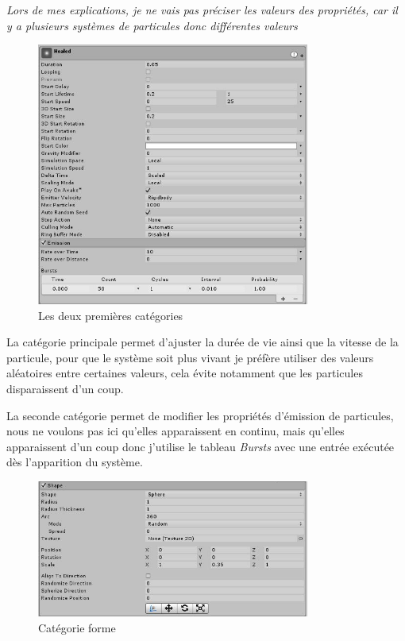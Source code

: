 \documentclass{article}
\begin{document}
\begin{center}
\emph{Lors de mes explications, je ne vais pas préciser les valeurs des propriétés, car il y a plusieurs systèmes de particules donc différentes valeurs}
\end{center}


\begin{figure}[H]
\centering
\includegraphics[width=0.8\textwidth]{cc/particles_main.png}
\caption{Les deux premières catégories}
\label{Les deux premières catégories}
\end{figure}


La catégorie principale permet d'ajuster la durée de vie ainsi que la vitesse de la particule, pour que le système soit plus vivant je préfère utiliser des valeurs aléatoires entre certaines valeurs, cela évite notamment que les particules disparaissent d'un coup.


La seconde catégorie permet de modifier les propriétés d'émission de particules, nous ne voulons pas ici qu'elles apparaissent en continu, mais qu'elles apparaissent d'un coup donc j'utilise le tableau \emph{Bursts} avec une entrée exécutée dès l'apparition du système.


\begin{figure}[H]
\centering
\includegraphics[width=0.8\textwidth]{cc/particles_shape.png}
\caption{Catégorie forme}
\label{Catégorie forme}
\end{figure}
\end{document}
